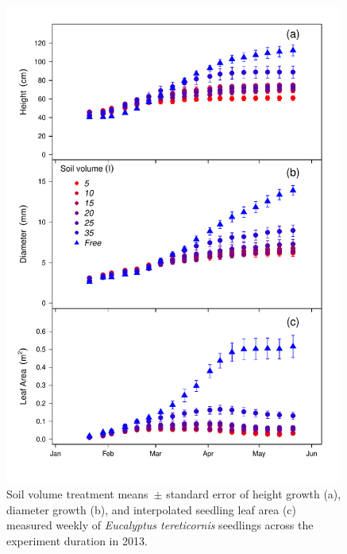 \documentclass[a4paper]{article}\usepackage[]{graphicx}\usepackage[]{color}
\begin{document}
\begin{figure}[h!]
    \centering
    \includegraphics[width=0.99\textwidth]{allometry.pdf}
    \caption{Soil volume treatment means~$\pm$ standard error of height growth (a), diameter growth (b), and interpolated seedling leaf area (c) measured weekly of \textit{Eucalyptus tereticornis} seedlings across the experiment duration in 2013.}
    \label{fig:figure2}
\end{figure}
\end{document}
